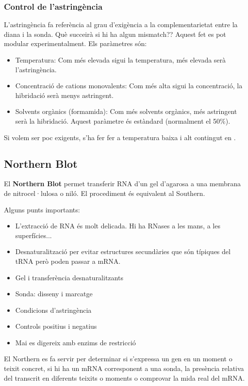 \subsubsection{Control de l'astringència}
\label{sec:contr-de-lastr}
L'astringència fa referència al grau d'exigència a la
complementarietat entre la diana i la sonda. Què succeirà si hi ha
algun mismatch?? Aquest fet es pot modular experimentalment. Els
paràmetres són:
\begin{itemize}
\item Temperatura: Com més elevada sigui la temperatura, més elevada
  serà l'astringència.

\item Concentració de cations monovalents: Com més alta sigui la
  concentració, la hibridació serà menys astringent. 

\item Solvents orgànics (formamida): Com més solvents orgànics, més astringent
  serà la hibridació. Aquest paràmetre és estàndard (normalment el 50\%).
\end{itemize}

Si volem ser poc exigents, s'ha fer fer a temperatura baixa i alt
contingut en .


\subsection{Northern Blot}
\label{sec:northern-blot-1}
El \textbf{Northern Blot} permet transferir RNA d'un gel d'agarosa a
una membrana de nitrocel·lulosa o niló. El procediment és equivalent
al Southern.

Alguns punts importants:
\begin{itemize}
\item L'extracció de RNA és molt delicada. Hi ha RNases a les mans, a
  les superfícies...
\item Desnaturalització per evitar estructures secundàries que són
  típiques del tRNA però poden passar a mRNA.
\item Gel i transferència desnaturalitzants
\item Sonda: disseny i marcatge
\item Condicions d'astringència
\item Controls positius i negatius
\item Mai es digereix amb enzims de restricció
\end{itemize}

El Northern es fa servir per determinar si s'expressa un gen en un
moment o teixit concret, si hi ha un mRNA corresponent a una sonda, la
presència relativa del transcrit en diferents teixits o moments o
comprovar la mida real del mRNA.


